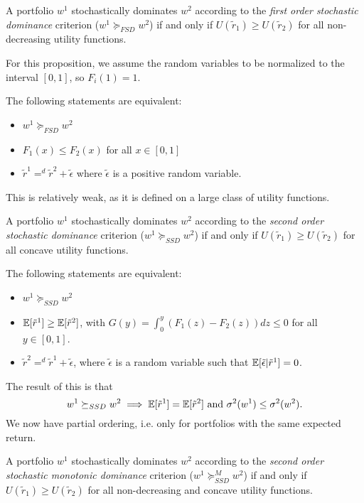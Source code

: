 \documentclass[twoside, titlepage]{article}
\begin{document}
\begin{definition}
    A portfolio $w^1$ stochastically dominates $w^2$ according to the \textit{first order stochastic dominance} criterion ($w^1 \succeq_{FSD} w^2$) if and only if $U(\tilde{r}_1) \geq U(\tilde{r}_2)$ for all non-decreasing utility functions.
\end{definition}

For this proposition, we assume the random variables to be normalized to the interval $[0, 1]$, so $F_i(1) = 1$.
\begin{proposition}
    The following statements are equivalent:
    \begin{itemize}
        \item $w^1 \succeq_{FSD} w^2$
        \item $F_1(x) \leq F_2(x)$ for all $x \in [0, 1]$
        \item $\tilde{r}^1 =^d \tilde{r}^2 + \tilde{\epsilon}$ where $\tilde{\epsilon}$ is a positive random variable.
    \end{itemize}
\end{proposition}
This is relatively weak, as it is defined on a large class of utility functions.
\begin{definition}
    A portfolio $w^1$ stochastically dominates $w^2$ according to the \textit{second order stochastic dominance} criterion ($w^1 \succeq_{SSD} w^2$) if and only if $U(\tilde{r}_1) \geq U(\tilde{r}_2)$ for all concave utility functions.
\end{definition}

\begin{proposition}
    The following statements are equivalent:
    \begin{itemize}
        \item $w^1 \succeq_{SSD} w^2$
        \item $\mathbb{E}[\tilde{r}^1] \geq \mathbb{E}[\tilde{r}^2]$, with $G(y) = \int_0^y\left(F_1(z) - F_2(z)\right) dz \leq 0$ for all $y \in [0, 1]$.
        \item $\tilde{r}^2 =^d \tilde{r}^1 + \tilde{\epsilon}$, where $\tilde{\epsilon}$ is a random variable such that $\mathbb{E}[\tilde{\epsilon} | \tilde{r}^1] = 0$.
    \end{itemize}
\end{proposition}
The result of this is that
\[
    w^1 \succeq_{SSD} w^2 \implies \mathbb{E}[\tilde{r}^1] = \mathbb{E}[\tilde{r}^2] \text{ and } \sigma^2(w^1) \leq \sigma^2(w^2).
\]
We now have partial ordering, i.e. only for portfolios with the same expected return.
\begin{definition}
    A portfolio $w^1$ stochastically dominates $w^2$ according to the \textit{second order stochastic monotonic dominance} criterion ($w^1 \succeq_{SSD}^M w^2$) if and only if $U(\tilde{r}_1) \geq U(\tilde{r}_2)$ for all non-decreasing and concave utility functions.
\end{definition}
\end{document}
